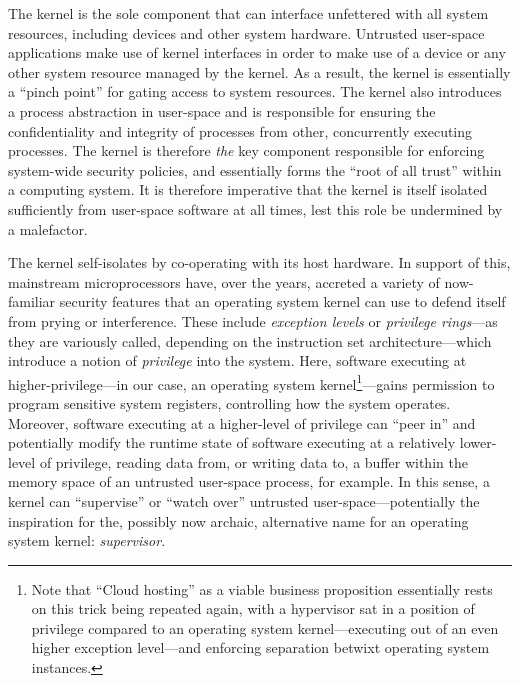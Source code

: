 \documentclass[a4paper, UKenglish, cleveref, autoref, thm-restate, colorlinks]{lipics-v2021}
\begin{document}
The kernel is the sole component that can interface unfettered with all system resources, including devices and other system hardware.
Untrusted user-space applications make use of kernel interfaces in order to make use of a device or any other system resource managed by the kernel.
As a result, the kernel is essentially a ``pinch point'' for gating access to system resources.
The kernel also introduces a process abstraction in user-space and is responsible for ensuring the confidentiality and integrity of processes from other, concurrently executing processes.
The kernel is therefore \emph{the} key component responsible for enforcing system-wide security policies, and essentially forms the ``root of all trust'' within a computing system.
It is therefore imperative that the kernel is itself isolated sufficiently from user-space software at all times, lest this role be undermined by a malefactor.

The kernel self-isolates by co-operating with its host hardware.
In support of this, mainstream microprocessors have, over the years, accreted a variety of now-familiar security features that an operating system kernel can use to defend itself from prying or interference.
These include \emph{exception levels} or \emph{privilege rings}---as they are variously called, depending on the instruction set architecture---which introduce a notion of \emph{privilege} into the system.
Here, software executing at higher-privilege---in our case, an operating system kernel\footnote{Note that ``Cloud hosting'' as a viable business proposition essentially rests on this trick being repeated again, with a hypervisor sat in a position of privilege compared to an operating system kernel---executing out of an even higher exception level---and enforcing separation betwixt operating system instances.}---gains permission to program sensitive system registers, controlling how the system operates.
Moreover, software executing at a higher-level of privilege can ``peer in'' and potentially modify the runtime state of software executing at a relatively lower-level of privilege, reading data from, or writing data to, a buffer within the memory space of an untrusted user-space process, for example.
In this sense, a kernel can ``supervise'' or ``watch over'' untrusted user-space---potentially the inspiration for the, possibly now archaic, alternative name for an operating system kernel: \emph{supervisor}.
\end{document}
